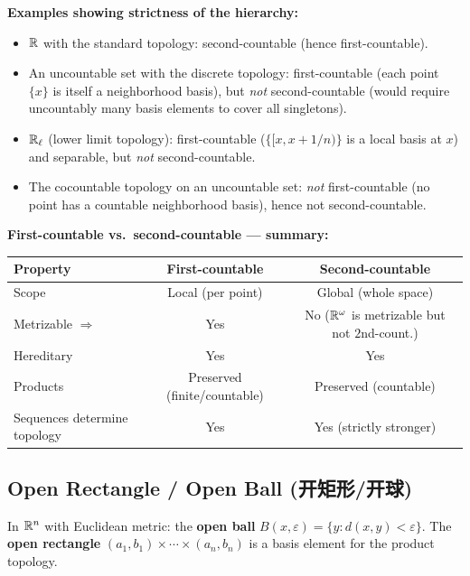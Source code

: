 \documentclass{article}
\begin{document}
\textbf{Examples showing strictness of the hierarchy:}
\begin{itemize}
  \item $\mathbb{R}$ with the standard topology: second-countable
    (hence first-countable).
  \item An uncountable set with the discrete topology: first-countable
    (each point $\{x\}$ is itself a neighborhood basis), but \emph{not}
    second-countable (would require uncountably many basis elements to cover
    all singletons).
  \item $\mathbb{R}_\ell$ (lower limit topology): first-countable
    ($\{[x, x+1/n)\}$ is a local basis at $x$) and separable, but \emph{not}
    second-countable.
  \item The cocountable topology on an uncountable set: \emph{not}
    first-countable (no point has a countable neighborhood basis), hence not
    second-countable.
\end{itemize}

\textbf{First-countable vs.\ second-countable --- summary:}

\begin{center}
  \begin{tabular}{lcc}
    \textbf{Property} & \textbf{First-countable} & \textbf{Second-countable} \\
    \hline
    Scope & Local (per point) & Global (whole space) \\
    Metrizable $\Rightarrow$ & Yes & No ($\mathbb{R}^\omega$ is metrizable
    but not $2$nd-count.) \\
    Hereditary & Yes & Yes \\
    Products & Preserved (finite/countable) & Preserved (countable) \\
    Sequences determine topology & Yes & Yes (strictly stronger) \\
  \end{tabular}
\end{center}

\subsection{Open Rectangle / Open Ball (开矩形/开球)}\label{def:open-rect}
In $\mathbb{R}^n$ with Euclidean metric: the \textbf{open ball} $B(x,
\varepsilon) = \{y : d(x, y) < \varepsilon\}$.
The \textbf{open rectangle} $(a_1, b_1) \times \cdots \times (a_n,
b_n)$ is a basis element for the product topology.

\end{document}
